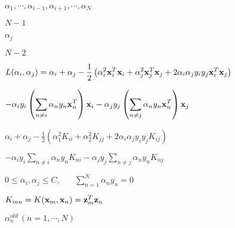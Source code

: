 \documentclass{article}
\def\lthtmlcheckvsize{\ifdim\ht\sizebox<\vsize 
  \ifdim\wd\sizebox<\hsize\expandafter\hfill\fi \expandafter\vfill
  \else\expandafter\vss\fi}%
\begin{document}
{\newpage\clearpage
{}%
$ \alpha_1,\cdots,\alpha_{i-1},\alpha_{i+1},\cdots,\alpha_N$%
\lthtmlindisplaymathZ
\lthtmlcheckvsize\clearpage}

{\newpage\clearpage
{}%
$ N-1$%
\lthtmlindisplaymathZ
\lthtmlcheckvsize\clearpage}

{\newpage\clearpage
{}%
$ \alpha_j$%
\lthtmlindisplaymathZ
\lthtmlcheckvsize\clearpage}

{\newpage\clearpage
{}%
$ N-2$%
\lthtmlindisplaymathZ
\lthtmlcheckvsize\clearpage}

{\newpage\clearpage
{}%
$\displaystyle L(\alpha_i,\alpha_j)
=\alpha_i+\alpha_j-\frac{1}{2}\left(
\alpha_i^2{\bf x}_i^T{\bf x}_i+\alpha_j^2{\bf x}_j^T{\bf x}_j
+2\alpha_i\alpha_jy_iy_j{\bf x}_i^T{\bf x}_j\right)$%
\lthtmlindisplaymathZ
\lthtmlcheckvsize\clearpage}

{\newpage\clearpage
{}%
$\displaystyle -\alpha_iy_i\left(\sum_{n\ne i}\alpha_ny_n{\bf x}_n^T\right){\bf x}_i
-\alpha_jy_j\left(\sum_{n\ne j}\alpha_ny_n{\bf x}_n^T\right){\bf x}_j$%
\lthtmlindisplaymathZ
\lthtmlcheckvsize\clearpage}

{\newpage\clearpage
{}%
$\displaystyle \alpha_i+\alpha_j-\frac{1}{2}\left(\alpha_1^2 K_{ii}+\alpha_2^2K_{jj}
+2\alpha_i\alpha_jy_iy_jK_{ij}\right)$%
\lthtmlindisplaymathZ
\lthtmlcheckvsize\clearpage}

{\newpage\clearpage
{}%
$\displaystyle -\alpha_iy_i\sum_{n\ne i}\alpha_ny_nK_{ni}
-\alpha_jy_j\sum_{n\ne j}\alpha_ny_nK_{nj}$%
\lthtmlindisplaymathZ
\lthtmlcheckvsize\clearpage}

{\newpage\clearpage
{}%
$\displaystyle 0\le\alpha_i,\alpha_j\le C,\;\;\;\;\;\;
\sum_{n=1}^N \alpha_ny_n=0$%
\lthtmlindisplaymathZ
\lthtmlcheckvsize\clearpage}

{\newpage\clearpage
{}%
$ K_{mn}=K({\bf x}_m,{\bf x}_n)={\bf z}_m^T{\bf z}_n$%
\lthtmlindisplaymathZ
\lthtmlcheckvsize\clearpage}

{\newpage\clearpage
{}%
$ \alpha_n^{old}\,(n=1,\cdots,N)$%
\lthtmlindisplaymathZ
\lthtmlcheckvsize\clearpage}
\end{document}
